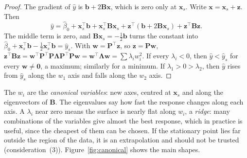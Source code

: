 \documentclass[11pt,a4paper]{article}
\numberwithin{equation}{section}
\theoremstyle{definition}
\begin{document}
\begin{proof}
The gradient of $\hat y$ is $\mathbf{b} + 2\mathbf{Bx}$, which is zero only at $\mathbf{x}_s$. Write $\mathbf{x} = \mathbf{x}_s + \mathbf{z}$. Then
\[
\hat y = \hat\beta_0 + \mathbf{x}_s^\top\mathbf{b} + \mathbf{x}_s^\top\mathbf{Bx}_s + \mathbf{z}^\top(\mathbf{b} + 2\mathbf{Bx}_s) + \mathbf{z}^\top\mathbf{Bz} .
\]
The middle term is zero, and $\mathbf{Bx}_s = -\frac12\mathbf{b}$ turns the constant into
$\hat\beta_0 + \mathbf{x}_s^\top\mathbf{b} - \frac12\mathbf{x}_s^\top\mathbf{b} = \hat y_s$. With $\mathbf{w} = \mathbf{P}^\top\mathbf{z}$, so $\mathbf{z} = \mathbf{Pw}$,
$\mathbf{z}^\top\mathbf{Bz} = \mathbf{w}^\top\mathbf{P}^\top\mathbf{P}\boldsymbol\Lambda\mathbf{P}^\top\mathbf{P}\mathbf{w} = \mathbf{w}^\top\boldsymbol\Lambda\mathbf{w} = \sum\lambda_iw_i^2$. If every $\lambda_i < 0$, then
$\hat y < \hat y_s$ for every $\mathbf{w} \ne \mathbf{0}$, a maximum; similarly for a minimum. If $\lambda_1 > 0 > \lambda_2$, then $\hat y$ rises from $\hat y_s$
along the $w_1$ axis and falls along the $w_2$ axis.
\end{proof}

The $w_i$ are the \emph{canonical variables}: new axes, centred at $\mathbf{x}_s$ and along the eigenvectors of $\mathbf{B}$. The
eigenvalues say how fast the response changes along each axis. A $\lambda_i$ near zero means the surface is nearly
flat along $w_i$, a \emph{ridge}: many combinations of the variables give almost the best response, which in
practice is useful, since the cheapest of them can be chosen. If the stationary point lies far outside the
region of the data, it is an extrapolation and should not be trusted (consideration~(3)). Figure~\ref{fig:canonical}
shows the main shapes.
\end{document}
